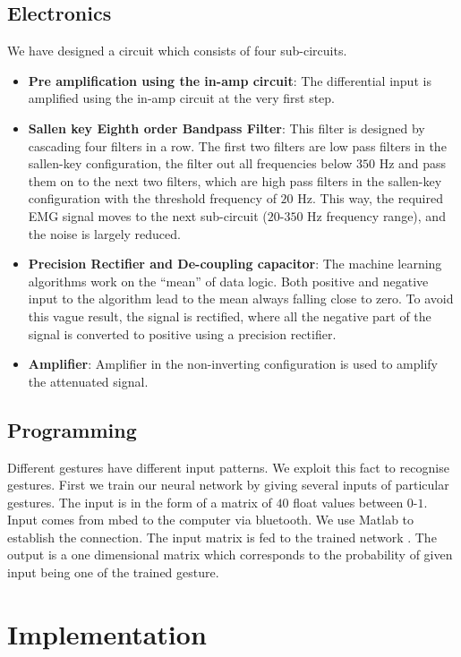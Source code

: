 \documentclass{article}
\begin{document}
\subsection{Electronics}
We have designed a circuit which consists of four sub-circuits.
\begin{itemize}
\item \textbf{Pre amplification using the in-amp circuit}: The differential input is amplified using the in-amp circuit at the very first step.
\item \textbf{Sallen key Eighth order Bandpass Filter}: This filter is designed by cascading four filters in a row. The first two filters are low pass filters in the sallen-key configuration, the filter out all frequencies below $350$ Hz and pass them on to the next two filters, which are high pass filters in the sallen-key configuration with the threshold frequency of $20$ Hz. This way, the required EMG signal moves to the next sub-circuit ($20$-$350$ Hz frequency range), and the noise is largely reduced.
\item \textbf{Precision Rectifier and De-coupling capacitor}: The machine learning algorithms work on the “mean” of data logic. Both positive and negative input to the algorithm lead to the mean always falling close to zero. To avoid this vague result, the signal is rectified, where all the negative part of the signal is converted to positive using a precision rectifier.
\item \textbf{Amplifier}: Amplifier in the non-inverting configuration is used to amplify the attenuated signal.
\end{itemize}
\subsection{Programming}
Different gestures have different input patterns. We exploit this fact to recognise gestures. First we train our neural network by giving several inputs of particular gestures. The input is in the form of a matrix of $40$ float values between $0$-$1$. 
\\
Input comes from mbed to the computer via bluetooth. We use Matlab to establish the connection. The input matrix is fed to the trained network . The output is a one dimensional matrix which corresponds to the probability of given input being one of the trained gesture. 

\section{Implementation}
\end{document}
